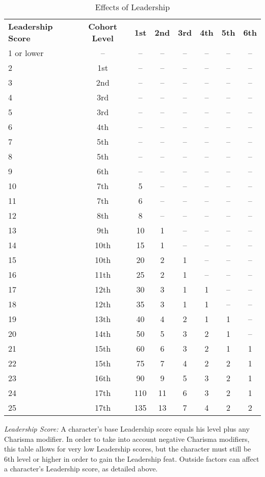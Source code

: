 \begin{table}[htb]
\caption{Effects of Leadership}
\centering
\begin{tabular}{l c *{6}{c}}
\textbf{Leadership Score} & \textbf{Cohort Level} & \textbf{1st} & \textbf{2nd} & \textbf{3rd} & \textbf{4th} & \textbf{5th} & \textbf{6th}\\
1 or lower & -- & -- & -- & -- & -- & -- & --\\
2 & 1st & -- & -- & -- & -- & -- & --\\
3 & 2nd & -- & -- & -- & -- & -- & --\\
4 & 3rd & -- & -- & -- & -- & -- & --\\
5 & 3rd & -- & -- & -- & -- & -- & --\\
6 & 4th & -- & -- & -- & -- & -- & --\\
7 & 5th & -- & -- & -- & -- & -- & --\\
8 & 5th & -- & -- & -- & -- & -- & --\\
9 & 6th & -- & -- & -- & -- & -- & --\\
10 & 7th & 5 & -- & -- & -- & -- & --\\
11 & 7th & 6 & -- & -- & -- & -- & --\\
12 & 8th & 8 & -- & -- & -- & -- & --\\
13 & 9th & 10 & 1 & -- & -- & -- & --\\
14 & 10th & 15 & 1 & -- & -- & -- & --\\
15 & 10th & 20 & 2 & 1 & -- & -- & --\\
16 & 11th & 25 & 2 & 1 & -- & -- & --\\
17 & 12th & 30 & 3 & 1 & 1 & -- & --\\
18 & 12th & 35 & 3 & 1 & 1 & -- & --\\
19 & 13th & 40 & 4 & 2 & 1 & 1 & --\\
20 & 14th & 50 & 5 & 3 & 2 & 1 & --\\
21 & 15th & 60 & 6 & 3 & 2 & 1 & 1\\
22 & 15th & 75 & 7 & 4 & 2 & 2 & 1\\
23 & 16th & 90 & 9 & 5 & 3 & 2 & 1\\
24 & 17th & 110 & 11 & 6 & 3 & 2 & 1\\
25 & 17th & 135 & 13 & 7 & 4 & 2 & 2\\
\end{tabular}
\end{table}

\textit{Leadership Score:} A character's base Leadership score equals his level 
plus any Charisma modifier. In order to take into account negative Charisma modifiers, 
this table allows for very low Leadership scores, but the character must still 
be 6th level or higher in order to gain the Leadership feat. Outside factors can 
affect a character's Leadership score, as detailed above.

